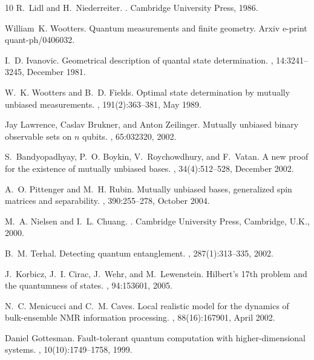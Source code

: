 \documentclass[aps,twocolumn,showpacs,nofootinbib,superscriptaddress]{revtex4}
\begin{document}
\begin{thebibliography}{10}
R.~Lidl and H.~Niederreiter.
.
\newblock Cambridge University Press, 1986.

William~K. Wootters.
\newblock Quantum measurements and finite geometry.
\newblock Arxiv e-print quant-ph/0406032.

I.~D. Ivanovic.
\newblock Geometrical description of quantal state determination.
, 14:3241--3245, December 1981.

W.~K. Wootters and B.~D. Fields.
\newblock Optimal state determination by mutually unbiased measurements.
, 191(2):363--381, May 1989.

Jay Lawrence, Caslav Brukner, and Anton Zeilinger.
\newblock Mutually unbiased binary observable sets on $n$ qubits.
, 65:032320, 2002.

S.~Bandyopadhyay, P.~O. Boykin, V.~Roychowdhury, and F.~Vatan.
\newblock A new proof for the existence of mutually unbiased bases.
, 34(4):512--528, December 2002.

A.~O. Pittenger and M.~H. Rubin.
\newblock Mutually unbiased bases, generalized spin matrices and separability.
, 390:255--278, October 2004.

M.~A. Nielsen and I.~L. Chuang.
.
\newblock Cambridge University Press, Cambridge, U.K., 2000.

B.~M. Terhal.
\newblock Detecting quantum entanglement.
, 287(1):313--335, 2002.

J.~Korbicz, J.~I. Cirac, J.~Wehr, and M.~Lewenstein.
\newblock Hilbert's 17th problem and the quantumness of states.
, 94:153601, 2005.

N.~C. Menicucci and C.~M. Caves.
\newblock Local realistic model for the dynamics of bulk-ensemble {NMR}
  information processing.
, 88(16):167901, April 2002.

Daniel Gottesman.
\newblock Fault-tolerant quantum computation with higher-dimensional systems.
, 10(10):1749--1758, 1999.


\end{thebibliography}
\end{document}
